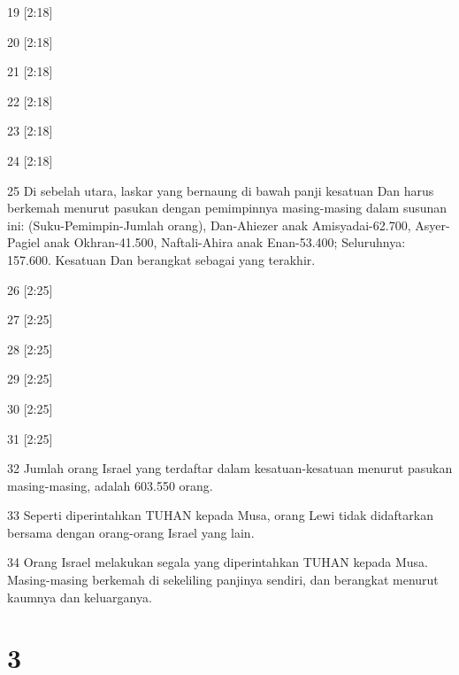 \par 19 [2:18]
\par 20 [2:18]
\par 21 [2:18]
\par 22 [2:18]
\par 23 [2:18]
\par 24 [2:18]
\par 25 Di sebelah utara, laskar yang bernaung di bawah panji kesatuan Dan harus berkemah menurut pasukan dengan pemimpinnya masing-masing dalam susunan ini: (Suku-Pemimpin-Jumlah orang), Dan-Ahiezer anak Amisyadai-62.700, Asyer-Pagiel anak Okhran-41.500, Naftali-Ahira anak Enan-53.400; Seluruhnya: 157.600. Kesatuan Dan berangkat sebagai yang terakhir.
\par 26 [2:25]
\par 27 [2:25]
\par 28 [2:25]
\par 29 [2:25]
\par 30 [2:25]
\par 31 [2:25]
\par 32 Jumlah orang Israel yang terdaftar dalam kesatuan-kesatuan menurut pasukan masing-masing, adalah 603.550 orang.
\par 33 Seperti diperintahkan TUHAN kepada Musa, orang Lewi tidak didaftarkan bersama dengan orang-orang Israel yang lain.
\par 34 Orang Israel melakukan segala yang diperintahkan TUHAN kepada Musa. Masing-masing berkemah di sekeliling panjinya sendiri, dan berangkat menurut kaumnya dan keluarganya.

\chapter{3}

